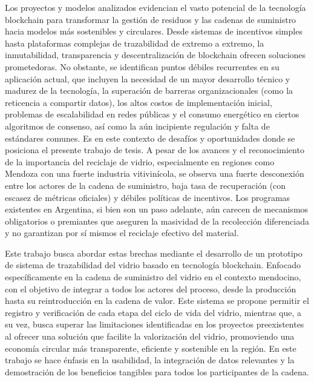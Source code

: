 Los proyectos y modelos analizados evidencian el vasto potencial de la tecnología blockchain para transformar la gestión de residuos y las cadenas de suministro hacia modelos más sostenibles y circulares. Desde sistemas de incentivos simples hasta plataformas complejas de trazabilidad de extremo a extremo, la inmutabilidad, transparencia y descentralización de blockchain ofrecen soluciones prometedoras. No obstante, se identifican puntos débiles recurrentes en su aplicación actual, que incluyen la necesidad de un mayor desarrollo técnico y madurez de la tecnología, la superación de barreras organizacionales (como la reticencia a compartir datos), los altos costos de implementación inicial, problemas de escalabilidad en redes públicas y el consumo energético en ciertos algoritmos de consenso, así como la aún incipiente regulación y falta de estándares comunes. Es en este contexto de desafíos y oportunidades donde se posiciona el presente trabajo de tesis. A pesar de los avances y el reconocimiento de la importancia del reciclaje de vidrio, especialmente en regiones como Mendoza con una fuerte industria vitivinícola, se observa una fuerte desconexión entre los actores de la cadena de suministro, baja tasa de recuperación (con escasez de métricas oficiales) y débiles políticas de incentivos. Los programas existentes en Argentina, si bien son un paso adelante, aún carecen de mecanismos obligatorios o premiantes que aseguren la masividad de la recolección diferenciada y no garantizan por sí mismos el reciclaje efectivo del material.

Este trabajo busca abordar estas brechas mediante el desarrollo de un prototipo de sistema de trazabilidad del vidrio basado en tecnología blockchain. Enfocado específicamente en la cadena de suministro del vidrio en el contexto mendocino, con el objetivo de integrar a todos los actores del proceso, desde la producción hasta su reintroducción en la cadena de valor. Este sistema se propone permitir el registro y verificación de cada etapa del ciclo de vida del vidrio, mientras que, a su vez, busca superar las limitaciones identificadas en los proyectos preexistentes al ofrecer una solución que facilite la valorización del vidrio, promoviendo una economía circular más transparente, eficiente y sostenible en la región. En este trabajo se hace énfasis en la usabilidad, la integración de datos relevantes y la demostración de los beneficios tangibles para todos los participantes de la cadena.

